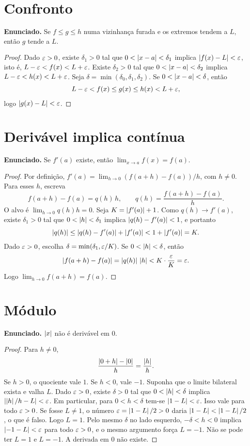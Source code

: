 \documentclass[11pt,a4paper]{article}
\begin{document}
\section{Confronto}

\textbf{Enunciado.} Se $f\le g\le h$ numa vizinhan\c{c}a furada e os extremos tendem a $L$, ent\~ao $g$ tende a $L$.

\begin{proof}
Dado $\varepsilon>0$, existe $\delta_1>0$ tal que $0<\left\lvert x-a \right\rvert<\delta_1$ implica $\left\lvert f(x)-L \right\rvert<\varepsilon$, isto \'e, $L-\varepsilon<f(x)<L+\varepsilon$. Existe $\delta_2>0$ tal que $0<\left\lvert x-a \right\rvert<\delta_2$ implica $L-\varepsilon<h(x)<L+\varepsilon$. Seja $\delta=\min(\delta_0,\delta_1,\delta_2)$. Se $0<\left\lvert x-a \right\rvert<\delta$, ent\~ao
\[
L-\varepsilon<f(x)\le g(x)\le h(x)<L+\varepsilon,
\]
logo $\left\lvert g(x)-L \right\rvert<\varepsilon$.
\end{proof}

\section{Deriv\'avel implica cont\'inua}

\textbf{Enunciado.} Se $f'(a)$ existe, ent\~ao $\lim_{x\to a}f(x)=f(a)$.

\begin{proof}
Por defini\c{c}\~ao, $f'(a)=\lim_{h\to 0}(f(a+h)-f(a))/h$, com $h\neq 0$. Para esses $h$, escreva
\[
f(a+h)-f(a)=q(h)\,h, \qquad q(h)=\frac{f(a+h)-f(a)}{h}.
\]
O alvo \'e $\lim_{h\to 0}q(h)h=0$. Seja $K=\left\lvert f'(a) \right\rvert+1$. Como $q(h)\to f'(a)$, existe $\delta_1>0$ tal que $0<\left\lvert h \right\rvert<\delta_1$ implica $\left\lvert q(h)-f'(a) \right\rvert<1$, e portanto
\[
\left\lvert q(h) \right\rvert\le \left\lvert q(h)-f'(a) \right\rvert+\left\lvert f'(a) \right\rvert<1+\left\lvert f'(a) \right\rvert=K.
\]
Dado $\varepsilon>0$, escolha $\delta=\min(\delta_1,\varepsilon/K)$. Se $0<\left\lvert h \right\rvert<\delta$, ent\~ao
\[
\left\lvert f(a+h)-f(a) \right\rvert=\left\lvert q(h) \right\rvert\,\left\lvert h \right\rvert<K\cdot\frac{\varepsilon}{K}=\varepsilon.
\]
Logo $\lim_{h\to 0}f(a+h)=f(a)$.
\end{proof}

\section{M\'odulo}

\textbf{Enunciado.} $\left\lvert x \right\rvert$ n\~ao \'e deriv\'avel em $0$.

\begin{proof}
Para $h\neq 0$,
\[
\frac{\left\lvert 0+h \right\rvert-\left\lvert 0 \right\rvert}{h}=\frac{\left\lvert h \right\rvert}{h}.
\]
Se $h>0$, o quociente vale $1$. Se $h<0$, vale $-1$. Suponha que o limite bilateral exista e valha $L$. Dado $\varepsilon>0$, existe $\delta>0$ tal que $0<\left\lvert h \right\rvert<\delta$ implica $\left\lvert \left\lvert h \right\rvert/h-L \right\rvert<\varepsilon$. Em particular, para $0<h<\delta$ tem-se $\left\lvert 1-L \right\rvert<\varepsilon$. Isso vale para todo $\varepsilon>0$. Se fosse $L\neq 1$, o n\'umero $\varepsilon=\left\lvert 1-L \right\rvert/2>0$ daria $\left\lvert 1-L \right\rvert<\left\lvert 1-L \right\rvert/2$, o que \'e falso. Logo $L=1$. Pelo mesmo $\delta$ no lado esquerdo, $-\delta<h<0$ implica $\left\lvert -1-L \right\rvert<\varepsilon$ para todo $\varepsilon>0$, e o mesmo argumento for\c{c}a $L=-1$. N\~ao se pode ter $L=1$ e $L=-1$. A derivada em $0$ n\~ao existe.
\end{proof}
\end{document}
